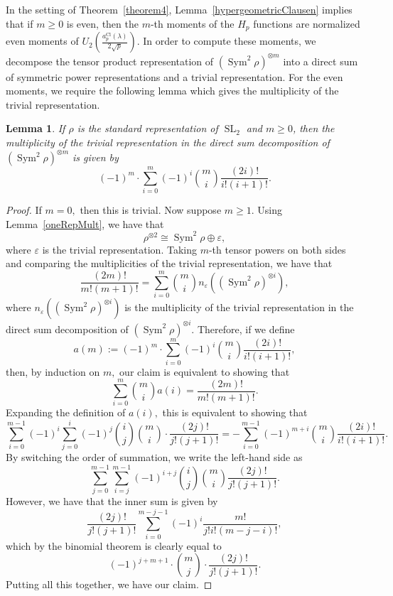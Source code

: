 \documentclass[12pt]{amsart}
\newtheorem{lemma}[theorem]{Lemma}
\theoremstyle{definition}
\theoremstyle{remark}
\numberwithin{equation}{section}
\DeclareMathOperator{\SL}{SL}
\DeclareMathOperator{\Sym}{Sym}
\DeclareMathOperator{\Cl}{Cl}
\begin{document}
In the setting of Theorem~\ref{theorem4}, Lemma~\ref{hypergeometricClausen} implies that if $m\geq 0$ is even, then the $m$-th moments of the $H_p$ functions are normalized even moments of $U_2\left(\frac{a^{\Cl}_p(\lambda)}{2\sqrt{p}}\right).$ In order to compute these moments, we decompose the tensor product representation of $(\Sym^2\rho)^{\otimes m}$ into a direct sum of symmetric power representations and a trivial representation. For the even moments, we require the following lemma which gives the multiplicity of the trivial representation.

\begin{lemma}\label{symsquareRepMult}
    If $\rho$ is the standard representation of $\SL_2$ and $m\geq 0$, then the multiplicity of the trivial representation in the direct sum decomposition of $(\Sym^2\rho)^{\otimes m}$ is given by
    $$
    (-1)^m\cdot\sum\limits_{i=0}^m(-1)^i\binom{m}{i}\frac{(2i)!}{i!(i+1)!}.
    $$
\end{lemma}

\begin{proof}
If $m=0,$ then this is trivial. Now suppose $m\geq1.$
Using Lemma~\ref{oneRepMult}, we have that
$$
\rho^{\otimes 2}\cong \Sym^2\rho\oplus\varepsilon,
$$
where $\varepsilon$ is the trivial representation. Taking $m$-th tensor powers on both sides and comparing the multiplicities of the trivial representation, we have that
$$
\frac{(2m)!}{m!(m+1)!} = \sum\limits_{i=0}^m \binom{m}{i}n_\varepsilon((\Sym^2\rho)^{\otimes i}),
$$
where $n_\varepsilon((\Sym^2\rho)^{\otimes i})$ is the multiplicity of the trivial representation in the direct sum decomposition of $(\Sym^2\rho)^{\otimes i}.$ Therefore, if we define
$$
a(m):=(-1)^m\cdot\sum\limits_{i=0}^m(-1)^i\binom{m}{i}\frac{(2i)!}{i!(i+1)!},
$$
then, by induction on $m,$ our claim is equivalent to showing that
$$
\sum\limits_{i=0}^{m}\binom{m}{i}a(i) = \frac{(2m)!}{m!(m+1)!}.
$$
Expanding the definition of $a(i),$ this is equivalent to showing that
$$
\sum\limits_{i=0}^{m-1}(-1)^i\sum\limits_{j=0}^i(-1)^j\binom{i}{j}\binom{m}{i}\cdot\frac
{(2j)!}{j!(j+1)!} = -\sum\limits_{i=0}^{m-1}(-1)^{m+i}\binom{m}{i}\frac{(2i)!}{i!(i+1)!}.
$$
By switching the order of summation, we write the left-hand side as
$$
\sum\limits_{j=0}^{m-1}\sum\limits_{i=j}^{m-1}(-1)^{i+j}\binom{i}{j}\binom{m}{i}\frac{(2j)!}{j!(j+1)!}.
$$
However, we have that the inner sum is given by
$$
\frac{(2j)!}{j!(j+1)!}\sum\limits_{i=0}^{m-j-1}(-1)^i\frac{m!}{j!i!(m-j-i)!},
$$
which by the binomial theorem is clearly equal to
$$
(-1)^{j+m+1}\cdot\binom{m}{j}\cdot\frac{(2j)!}{j!(j+1)!}.
$$
Putting all this together, we have our claim.
\end{proof}
\end{document}
